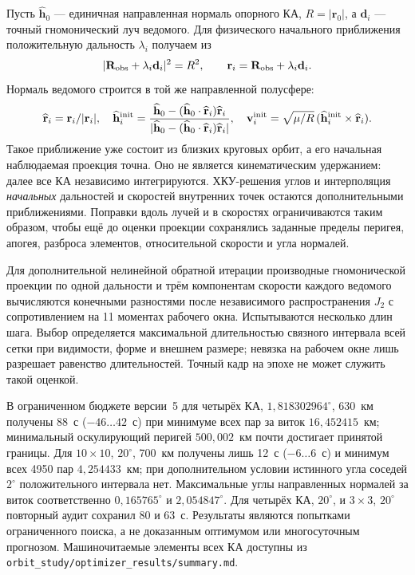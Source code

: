 \documentclass[a4paper,12pt]{article}
\begin{document}
Пусть $\widehat{\mathbf h}_0$ --- единичная направленная нормаль
опорного КА, $R=|\mathbf r_0|$, а $\mathbf d_i$ --- точный
гномонический луч ведомого. Для физического начального приближения
положительную дальность $\lambda_i$ получаем из
\begin{equation}
 |\mathbf R_{\rm obs}+\lambda_i\mathbf d_i|^2=R^2,
 \qquad \mathbf r_i=\mathbf R_{\rm obs}+\lambda_i\mathbf d_i.
\end{equation}
Нормаль ведомого строится в той же направленной полусфере:
\begin{equation}
 \widehat{\mathbf r}_i=\mathbf r_i/|\mathbf r_i|,\quad
 \widehat{\mathbf h}_i^{\rm init}=
 \frac{\widehat{\mathbf h}_0-
 (\widehat{\mathbf h}_0\cdot\widehat{\mathbf r}_i)
 \widehat{\mathbf r}_i}
 {|\widehat{\mathbf h}_0-
 (\widehat{\mathbf h}_0\cdot\widehat{\mathbf r}_i)
 \widehat{\mathbf r}_i|},\quad
 \mathbf v_i^{\rm init}=\sqrt{\mu/R}\,
 (\widehat{\mathbf h}_i^{\rm init}\times\widehat{\mathbf r}_i).
\end{equation}
Такое приближение уже состоит из близких круговых орбит, а
его начальная наблюдаемая проекция точна. Оно не является
кинематическим удержанием: далее все КА независимо интегрируются.
ХКУ-решения углов и интерполяция \emph{начальных} дальностей и
скоростей внутренних точек остаются дополнительными приближениями.
Поправки вдоль лучей и в скоростях ограничиваются таким образом,
чтобы ещё до оценки проекции сохранялись заданные пределы перигея,
апогея, разброса элементов, относительной скорости и угла нормалей.

Для дополнительной нелинейной обратной итерации производные
гномонической проекции по одной дальности и трём компонентам скорости
каждого ведомого вычисляются конечными разностями после независимого
распространения $J_2$ с сопротивлением на 11 моментах рабочего окна.
Испытываются несколько длин шага. Выбор определяется максимальной
длительностью связного интервала всей сетки при видимости, форме и
внешнем размере; невязка на рабочем окне лишь разрешает равенство
длительностей. Точный кадр на эпохе не может служить такой оценкой.

В ограниченном бюджете версии~5 для четырёх КА,
$1{,}818302964^\circ$, 630~км получены 88~с ($-46\ldots42$~с)
при минимуме всех пар за виток $16{,}452415$~км; минимальный
оскулирующий перигей $500{,}002$~км почти достигает принятой границы.
Для $10\times10$, $20^\circ$, 700~км получены лишь 12~с
($-6\ldots6$~с) и минимум всех 4950 пар $4{,}254433$~км;
при дополнительном условии истинного угла соседей $2^\circ$
положительного интервала нет. Максимальные углы направленных нормалей
за виток соответственно $0{,}165765^\circ$ и $2{,}054847^\circ$.
Для четырёх КА, $20^\circ$, и $3\times3$, $20^\circ$ повторный
аудит сохранил 80 и 63~с. Результаты являются попытками ограниченного
поиска, а не доказанным оптимумом или многосуточным прогнозом.
Машиночитаемые элементы всех КА доступны из
\texttt{orbit\_study/optimizer\_results/summary.md}.
\end{document}
